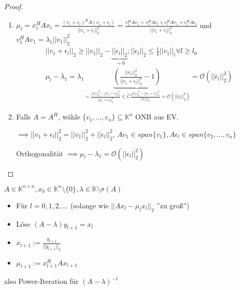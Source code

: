 \begin{proof}
\begin{enumerate}
		\item $\mu_l = x_l^HAx_l = \frac{(v_1 + \epsilon_l)^HA(v_1+\epsilon_l)}{||v_1 + \epsilon_l||_2^2} = \frac{v_1^HAv_1 + v_1^HA\epsilon_l + \epsilon_l^HAv_1 + \epsilon_l^HA\epsilon_l}{||v_1 + \epsilon_l||_2^2}$ und $v_1^HAv_1 = \lambda_1 ||v_1||_2^2$
		\begin{align*}
			||v_1 + \epsilon_l||_2 \geq ||v_1||_2 - \underbrace{||\epsilon_l||_2}_{\rightarrow 0}; ||\epsilon_l||_2 \leq \frac{1}{4} ||v_1||_l \forall l \geq l_0\\
			\mu_l - \lambda_1 = \lambda_1 \underbrace{\left(\frac{||v_1||_2^2}{||v_1 + \epsilon_l||_2^2} - 1\right)}_{= \frac{||v_1||_2^2 - ||v_1 + \epsilon_l||_2^2}{||v_1 + \epsilon_l||_2^2} \leq \tilde{C} \frac{||v_1||_2^2 - ||v_1 + \epsilon_l||_2^2}{||v_1||_2} = \mathcal{O}(||\epsilon_l||_2^2)} =
			\mathcal{O}(||\epsilon_l||_2^2)
		\end{align*}
		
		\item Falls $A=A^H$, wähle $\{v_1, ..., v_n\} \subseteq \mathbb{K}^n$ ONB aus EV.
		
		$\implies ||v_1 + \epsilon_l||_2^2 = ||v_1||_2^2 + ||\epsilon_l||_2^2$, $Av_1 \in span\{v_1\}, A\epsilon_l \in span\{v_2, ..., v_n\}$
		
		Orthogonalität $\implies \mu_l - \lambda_1 = \mathcal{O}(||\epsilon_l||_2^2)$
	\end{enumerate}
\end{proof}

\begin{algorithm}
	$A \in \mathbb{K}^{n\times n}, x_0 \in \mathbb{K}^n\setminus\{0\}, \lambda \in \mathbb{K}\setminus\sigma(A)$
	
	\begin{itemize}
		\item Für $l=0,1,2,...$ (solange wie $||Ax_l - \mu_l x_l||_2 $ ''zu groß'')
		\item \hspace{0.5cm} Löse $(A-\lambda)y_{l+1} = x_l$
		\item \hspace{0.5cm} $x_{l+1} := \frac{y_{l+1}}{||y_{l+1}||_2}$
		\item \hspace{0.5cm} $\mu_{l+1} := x_{l+1}^HAx_{l+1}$
	\end{itemize}
	also Power-Iteration für $(A-\lambda)^{-1}$
\end{algorithm}

